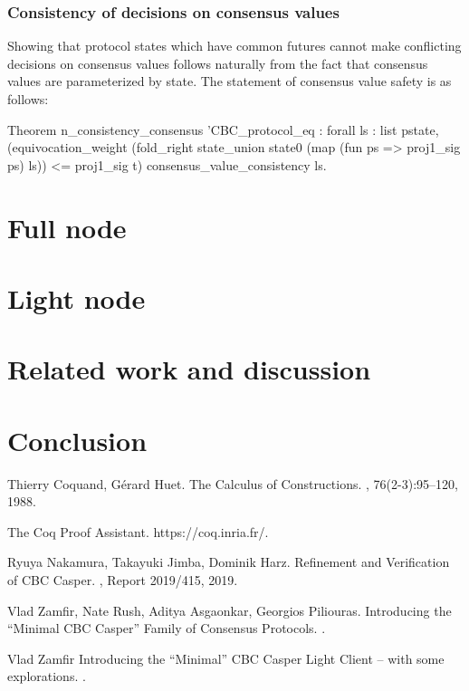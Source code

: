 \documentclass[runningheads]{llncs}
\begin{document}
\subsubsection{Consistency of decisions on consensus values} 
Showing that protocol states which have common futures cannot make conflicting decisions on consensus values follows naturally from the fact that consensus values are parameterized by state. The statement of consensus value safety is as follows: 
\begin{coq}
Theorem n_consistency_consensus '{CBC_protocol_eq} :
	forall ls : list pstate,
	(equivocation_weight (fold_right state_union state0 (map (fun ps => proj1_sig ps) ls)) <= proj1_sig t)%
	consensus_value_consistency ls. 
\end{coq}

\section{Full node} 
\label{sec:full}


\section{Light node}
\label{sec:light}


\section{Related work and discussion}
\label{sec:related}



\section{Conclusion}
\label{sec:conclusion}


\begin{thebibliography}{99}

 Thierry Coquand, Gérard Huet.
\newblock The Calculus of Constructions.
, 76(2-3):95--120, 1988.

\newblock The Coq Proof Assistant. 
\newblock https://coq.inria.fr/.

 Ryuya Nakamura, Takayuki Jimba, Dominik Harz.
\newblock Refinement and Verification of CBC Casper. 
, Report 2019/415, 2019.

 Vlad Zamfir, Nate Rush, Aditya Asgaonkar, Georgios Piliouras.
\newblock Introducing the ``Minimal CBC Casper'' Family of Consensus Protocols. 
. 

 Vlad Zamfir
\newblock Introducing the ``Minimal'' CBC Casper Light Client -- with some explorations. 
. 
\end{thebibliography}




\end{document}
